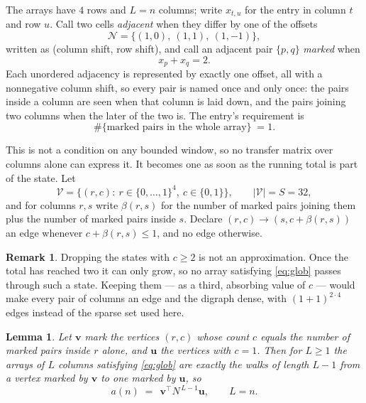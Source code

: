\documentclass[11pt,a4paper]{article}
\theoremstyle{plain}
\newtheorem{lemma}[theorem]{Lemma}
\theoremstyle{definition}
\newtheorem{remark}[theorem]{Remark}
\begin{document}
The arrays have $4$ rows and $L=n$ columns; write $x_{t,u}$ for the entry in
column $t$ and row $u$. Call two cells \emph{adjacent} when they differ by one of the
offsets
\[
\mathcal N=\{(1,0),\ (1,1),\ (1,-1)\},
\]
written as (column shift, row shift), and call an adjacent pair $\{p,q\}$
\emph{marked} when
\[
x_{p}+x_{q}=2 .
\]
Each unordered adjacency is represented by exactly one offset, all with a nonnegative column
shift, so every pair is named once and only once: the pairs inside a column are seen when
that column is laid down, and the pairs joining two columns when the later of the two is. The
entry's requirement is
\begin{equation}\label{eq:glob}
\#\{\text{marked pairs in the whole array}\}\;=1.
\end{equation}

This is not a condition on any bounded window, so no transfer matrix over columns alone can
express it. It becomes one as soon as the running total is part of the state. Let
\[
\mathcal V=\bigl\{(r,c):\ r\in\{0,\dots,1\}^{4},\ c\in\{0,1\}\bigr\},
\qquad |\mathcal V|=S=32,
\]
and for columns $r,s$ write $\beta(r,s)$ for the number of marked pairs joining them plus the
number of marked pairs inside $s$. Declare $(r,c)\to(s,c+\beta(r,s))$ an edge whenever
$c+\beta(r,s)\le1$, and no edge otherwise.

\begin{remark}
Dropping the states with $c\ge2$ is not an approximation. Once the total has reached two it
can only grow, so no array satisfying \eqref{eq:glob} passes through such a state. Keeping
them --- as a third, absorbing value of $c$ --- would make every pair of columns an edge and
the digraph dense, with $(1+1)^{2\cdot4}$ edges instead of the sparse set used here.
\end{remark}

\begin{lemma}\label{lem:walk}
Let $\mathbf{v}$ mark the vertices $(r,c)$ whose count $c$ equals the number of marked pairs
inside $r$ alone, and $\mathbf{u}$ the vertices with $c=1$. Then for $L\ge1$ the arrays
of $L$ columns satisfying \eqref{eq:glob} are exactly the walks of length $L-1$ from a
vertex marked by $\mathbf{v}$ to one marked by $\mathbf{u}$, so
\[
a(n)\;=\;\,\mathbf{v}^{\!\top}N^{\,L-1}\mathbf{u},\qquad L=n .
\]
\end{lemma}
\end{document}

